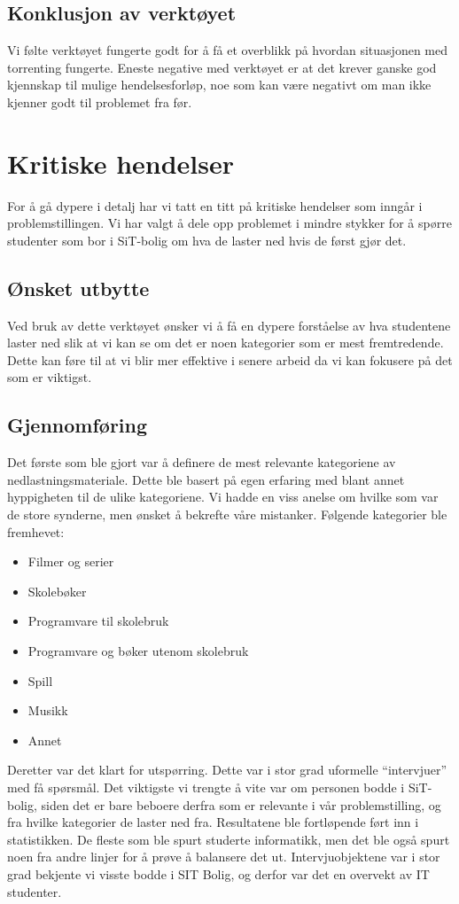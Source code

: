 \subsection{Konklusjon av verktøyet}
Vi følte verktøyet fungerte godt for å få et overblikk på hvordan situasjonen med torrenting fungerte. Eneste negative med verktøyet er at det krever ganske god kjennskap til mulige hendelsesforløp, noe som kan være negativt om man ikke kjenner godt til problemet fra før. 

\section{Kritiske hendelser}
For å gå dypere i detalj har vi tatt en titt på kritiske hendelser som inngår i problemstillingen. Vi har valgt å dele opp problemet i mindre stykker for å spørre studenter som bor i SiT-bolig om hva de laster ned hvis de først gjør det. 

\subsection{Ønsket utbytte}
Ved bruk av dette verktøyet ønsker vi å få en dypere forståelse av hva studentene laster ned slik at vi kan se om det er noen kategorier som er mest fremtredende. Dette kan føre til at vi blir mer effektive i senere arbeid da vi kan fokusere på det som er viktigst.

\subsection{Gjennomføring}
Det første som ble gjort var å definere de mest relevante kategoriene av nedlastningsmateriale. Dette ble basert på egen erfaring med blant annet hyppigheten til de ulike kategoriene. Vi hadde en viss anelse om hvilke som var de store synderne, men ønsket å bekrefte våre mistanker. Følgende kategorier ble fremhevet: 
\begin{itemize}
    \item Filmer og serier
    \item Skolebøker
    \item Programvare til skolebruk
    \item Programvare og bøker utenom skolebruk
    \item Spill
    \item Musikk
    \item Annet
\end{itemize}

Deretter var det klart for utspørring. Dette var i stor grad uformelle ``intervjuer'' med få spørsmål. Det viktigste vi trengte å vite var om personen bodde i SiT-bolig, siden det er bare beboere derfra som er relevante i vår problemstilling, og fra hvilke kategorier de laster ned fra. Resultatene ble fortløpende ført inn i statistikken. De fleste som ble spurt studerte informatikk, men det ble også spurt noen fra andre linjer for å prøve å balansere det ut. Intervjuobjektene var i stor grad bekjente vi visste bodde i SIT Bolig, og derfor var det en overvekt av IT studenter.

